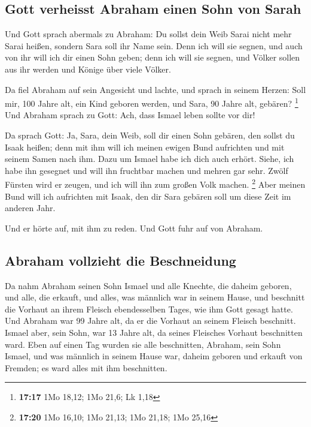 \hypertarget{gott-verheisst-abraham-einen-sohn-von-sarah}{%
\subsection{Gott verheisst Abraham einen Sohn von
Sarah}\label{gott-verheisst-abraham-einen-sohn-von-sarah}}

 Und Gott sprach abermals zu Abraham: Du sollst dein Weib
Sarai nicht mehr Sarai heißen, sondern Sara soll ihr Name sein.
 Denn ich will sie segnen, und auch von ihr will ich dir
einen Sohn geben; denn ich will sie segnen, und Völker sollen aus ihr
werden und Könige über viele Völker.

 Da fiel Abraham auf sein Angesicht und lachte, und
sprach in seinem Herzen: Soll mir, 100 Jahre alt, ein Kind geboren
werden, und Sara, 90 Jahre alt, gebären? \footnote{\textbf{17:17} 1Mo
  18,12; 1Mo 21,6; Lk 1,18}  Und Abraham sprach zu Gott:
Ach, dass Ismael leben sollte vor dir!

 Da sprach Gott: Ja, Sara, dein Weib, soll dir einen Sohn
gebären, den sollst du Isaak heißen; denn mit ihm will ich meinen ewigen
Bund aufrichten und mit seinem Samen nach ihm.  Dazu um
Ismael habe ich dich auch erhört. Siehe, ich habe ihn gesegnet und will
ihn fruchtbar machen und mehren gar sehr. Zwölf Fürsten wird er zeugen,
und ich will ihn zum großen Volk machen. \footnote{\textbf{17:20} 1Mo
  16,10; 1Mo 21,13; 1Mo 21,18; 1Mo 25,16}  Aber meinen
Bund will ich aufrichten mit Isaak, den dir Sara gebären soll um diese
Zeit im anderen Jahr.

 Und er hörte auf, mit ihm zu reden. Und Gott fuhr auf
von Abraham.

\hypertarget{abraham-vollzieht-die-beschneidung}{%
\subsection{Abraham vollzieht die
Beschneidung}\label{abraham-vollzieht-die-beschneidung}}

 Da nahm Abraham seinen Sohn Ismael und alle Knechte, die
daheim geboren, und alle, die erkauft, und alles, was männlich war in
seinem Hause, und beschnitt die Vorhaut an ihrem Fleisch ebendesselben
Tages, wie ihm Gott gesagt hatte.  Und Abraham war 99
Jahre alt, da er die Vorhaut an seinem Fleisch beschnitt.
 Ismael aber, sein Sohn, war 13 Jahre alt, da seines
Fleisches Vorhaut beschnitten ward.  Eben auf einen Tag
wurden sie alle beschnitten, Abraham, sein Sohn Ismael, 
und was männlich in seinem Hause war, daheim geboren und erkauft von
Fremden; es ward alles mit ihm beschnitten.

